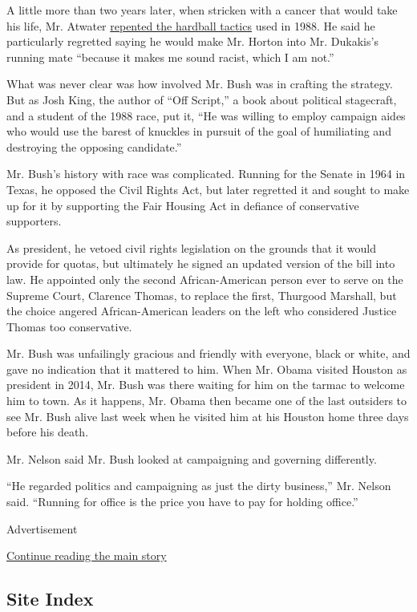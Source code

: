 A little more than two years later, when stricken with a cancer that
would take his life, Mr. Atwater
\href{https://www.nytimes.com/1991/01/13/us/gravely-ill-atwater-offers-apology.html}{repented
the hardball tactics} used in 1988. He said he particularly regretted
saying he would make Mr. Horton into Mr. Dukakis's running mate
``because it makes me sound racist, which I am not.''

What was never clear was how involved Mr. Bush was in crafting the
strategy. But as Josh King, the author of ``Off Script,'' a book about
political stagecraft, and a student of the 1988 race, put it, ``He was
willing to employ campaign aides who would use the barest of knuckles in
pursuit of the goal of humiliating and destroying the opposing
candidate.''

Mr. Bush's history with race was complicated. Running for the Senate in
1964 in Texas, he opposed the Civil Rights Act, but later regretted it
and sought to make up for it by supporting the Fair Housing Act in
defiance of conservative supporters.

As president, he vetoed civil rights legislation on the grounds that it
would provide for quotas, but ultimately he signed an updated version of
the bill into law. He appointed only the second African-American person
ever to serve on the Supreme Court, Clarence Thomas, to replace the
first, Thurgood Marshall, but the choice angered African-American
leaders on the left who considered Justice Thomas too conservative.

Mr. Bush was unfailingly gracious and friendly with everyone, black or
white, and gave no indication that it mattered to him. When Mr. Obama
visited Houston as president in 2014, Mr. Bush was there waiting for him
on the tarmac to welcome him to town. As it happens, Mr. Obama then
became one of the last outsiders to see Mr. Bush alive last week when he
visited him at his Houston home three days before his death.

Mr. Nelson said Mr. Bush looked at campaigning and governing
differently.

``He regarded politics and campaigning as just the dirty business,'' Mr.
Nelson said. ``Running for office is the price you have to pay for
holding office.''

Advertisement

\protect\hyperlink{after-bottom}{Continue reading the main story}

\hypertarget{site-index}{%
\subsection{Site Index}\label{site-index}}

